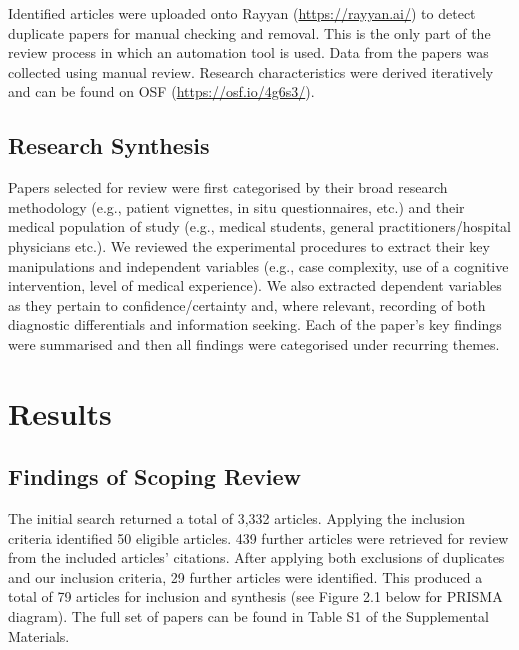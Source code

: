 \documentclass[a4paper, nobind]{templates/ociamthesis}
\begin{document}
Identified articles were uploaded onto Rayyan (\url{https://rayyan.ai/}) to detect duplicate papers for manual checking and removal. This is the only part of the review process in which an automation tool is used. Data from the papers was collected using manual review. Research characteristics were derived iteratively and can be found on OSF (\url{https://osf.io/4g6s3/}).

\subsection*{Research Synthesis}\label{research-synthesis}

Papers selected for review were first categorised by their broad research methodology (e.g., patient vignettes, in situ questionnaires, etc.) and their medical population of study (e.g., medical students, general practitioners/hospital physicians etc.). We reviewed the experimental procedures to extract their key manipulations and independent variables (e.g., case complexity, use of a cognitive intervention, level of medical experience). We also extracted dependent variables as they pertain to confidence/certainty and, where relevant, recording of both diagnostic differentials and information seeking. Each of the paper's key findings were summarised and then all findings were categorised under recurring themes.

\section*{Results}\label{results}

\subsection*{Findings of Scoping Review}\label{findings-of-scoping-review}

The initial search returned a total of 3,332 articles. Applying the inclusion criteria identified 50 eligible articles. 439 further articles were retrieved for review from the included articles' citations. After applying both exclusions of duplicates and our inclusion criteria, 29 further articles were identified. This produced a total of 79 articles for inclusion and synthesis (see Figure 2.1 below for PRISMA diagram). The full set of papers can be found in Table S1 of the Supplemental Materials.
\end{document}
